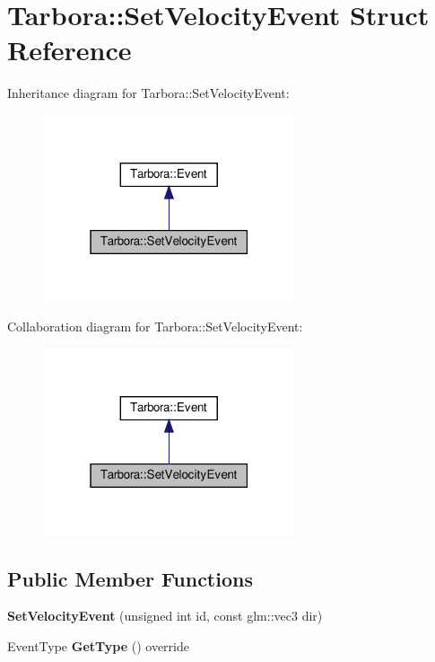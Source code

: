 \hypertarget{structTarbora_1_1SetVelocityEvent}{}\section{Tarbora\+:\+:Set\+Velocity\+Event Struct Reference}
\label{structTarbora_1_1SetVelocityEvent}


Inheritance diagram for Tarbora\+:\+:Set\+Velocity\+Event\+:\nopagebreak
\begin{figure}[H]
\begin{center}
\leavevmode
\includegraphics[width=211pt]{structTarbora_1_1SetVelocityEvent__inherit__graph}
\end{center}
\end{figure}


Collaboration diagram for Tarbora\+:\+:Set\+Velocity\+Event\+:\nopagebreak
\begin{figure}[H]
\begin{center}
\leavevmode
\includegraphics[width=211pt]{structTarbora_1_1SetVelocityEvent__coll__graph}
\end{center}
\end{figure}
\subsection*{Public Member Functions}
\begin{DoxyCompactItemize}
\item 
\mbox{\label{structTarbora_1_1SetVelocityEvent_a21010a548fbf7f8f6cfc5b9a928fb5f0}} 
{\bfseries Set\+Velocity\+Event} (unsigned int id, const glm\+::vec3 dir)
\item 
\mbox{\label{structTarbora_1_1SetVelocityEvent_a94a21dc22e36da468b992c4e0c4684c9}} 
Event\+Type {\bfseries Get\+Type} () override
\end{DoxyCompactItemize}
